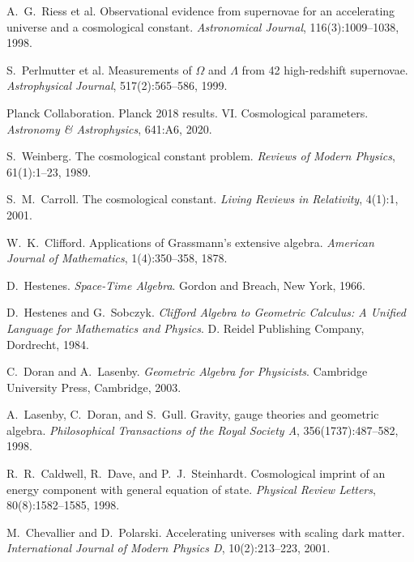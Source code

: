 \documentclass[11pt,a4paper]{article}
\numberwithin{equation}{section}
\theoremstyle{plain}
\theoremstyle{definition}
\theoremstyle{remark}
\begin{document}
\begin{thebibliography}{99}

A.~G.~Riess et al.
\newblock Observational evidence from supernovae for an accelerating universe and a cosmological constant.
\newblock \emph{Astronomical Journal}, 116(3):1009--1038, 1998.

S.~Perlmutter et al.
\newblock Measurements of $\Omega$ and $\Lambda$ from 42 high-redshift supernovae.
\newblock \emph{Astrophysical Journal}, 517(2):565--586, 1999.

Planck Collaboration.
\newblock Planck 2018 results. VI. Cosmological parameters.
\newblock \emph{Astronomy \& Astrophysics}, 641:A6, 2020.

S.~Weinberg.
\newblock The cosmological constant problem.
\newblock \emph{Reviews of Modern Physics}, 61(1):1--23, 1989.

S.~M.~Carroll.
\newblock The cosmological constant.
\newblock \emph{Living Reviews in Relativity}, 4(1):1, 2001.

W.~K.~Clifford.
\newblock Applications of Grassmann's extensive algebra.
\newblock \emph{American Journal of Mathematics}, 1(4):350--358, 1878.

D.~Hestenes.
\newblock \emph{Space-Time Algebra}.
\newblock Gordon and Breach, New York, 1966.

D.~Hestenes and G.~Sobczyk.
\newblock \emph{Clifford Algebra to Geometric Calculus: A Unified Language for Mathematics and Physics}.
\newblock D. Reidel Publishing Company, Dordrecht, 1984.

C.~Doran and A.~Lasenby.
\newblock \emph{Geometric Algebra for Physicists}.
\newblock Cambridge University Press, Cambridge, 2003.

A.~Lasenby, C.~Doran, and S.~Gull.
\newblock Gravity, gauge theories and geometric algebra.
\newblock \emph{Philosophical Transactions of the Royal Society A}, 356(1737):487--582, 1998.

R.~R.~Caldwell, R.~Dave, and P.~J.~Steinhardt.
\newblock Cosmological imprint of an energy component with general equation of state.
\newblock \emph{Physical Review Letters}, 80(8):1582--1585, 1998.

M.~Chevallier and D.~Polarski.
\newblock Accelerating universes with scaling dark matter.
\newblock \emph{International Journal of Modern Physics D}, 10(2):213--223, 2001.


\end{thebibliography}
\end{document}
